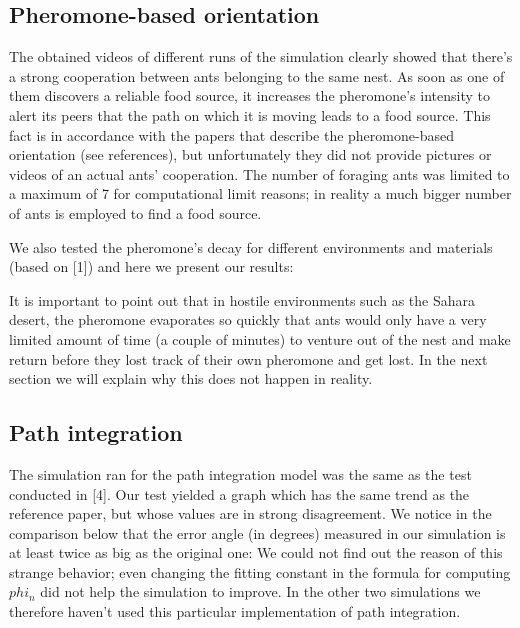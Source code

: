 \documentclass[11pt]{article}
\begin{document}
\subsection{Pheromone-based orientation}
The obtained videos of different runs of the simulation clearly showed that there's a strong cooperation between ants belonging to the same nest. As soon as one of them discovers a reliable food source, it increases the pheromone's intensity to alert its peers that the path on which it is moving leads to a food source. This fact is in accordance with the papers that describe the pheromone-based orientation (see references), but unfortunately they did not provide pictures or videos of an actual ants' cooperation. The number of foraging ants was limited to a maximum of 7 for computational limit reasons; in reality a much bigger number of ants is employed to find a food source.

We also tested the pheromone's decay for different environments and materials (based on [1]) and here we present our results:

It is important to point out that in hostile environments such as the Sahara desert, the pheromone evaporates so quickly that ants would only have a very limited amount of time (a couple of minutes) to venture out of the nest and make return before they lost track of their own pheromone and get lost. In the next section we will explain why this does not happen in reality.

\subsection{Path integration}
The simulation ran for the path integration model was the same as the test conducted in [4]. Our test yielded a graph which has the same trend as the reference paper, but whose values are in strong disagreement. We notice in the comparison below that the error angle (in degrees) measured in our simulation is at least twice as big as the original one:
We could not find out the reason of this strange behavior; even changing the fitting constant in the formula for computing $phi_n$ did not help the simulation to improve. In the other two simulations we therefore haven't used this particular implementation of path integration.
\end{document}
